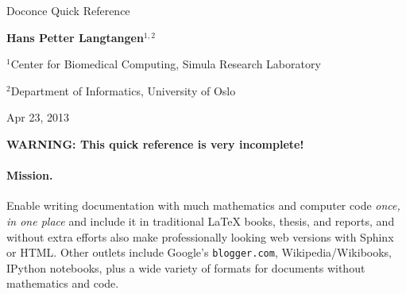 \documentclass[%
oneside,                 %
final,                   %
10pt]{article}
\begin{document}




\begin{center}
{\LARGE\bf
\begin{spacing}{1.25}
Doconce Quick Reference
\end{spacing}
}
\end{center}



\begin{center}
{\bf Hans Petter Langtangen${}^{1, 2}$} \\ [0mm]
\end{center}

\begin{center}
\centerline{{\small ${}^1$Center for Biomedical Computing, Simula Research Laboratory}}
\centerline{{\small ${}^2$Department of Informatics, University of Oslo}}
\end{center}




\begin{center}
Apr 23, 2013
\end{center}

\vspace{1cm}



\tableofcontents

\vspace{1cm} %





\textbf{WARNING: This quick reference is very incomplete!}

\paragraph{Mission.}
Enable writing documentation with much mathematics and
computer code \emph{once, in one place} and include it in traditional {\LaTeX}
books, thesis, and reports, and without extra efforts also make
professionally looking web versions with Sphinx or HTML. Other outlets
include Google's \Verb!blogger.com!, Wikipedia/Wikibooks, IPython
notebooks, plus a wide variety of formats for documents without
mathematics and code.
\end{document}

